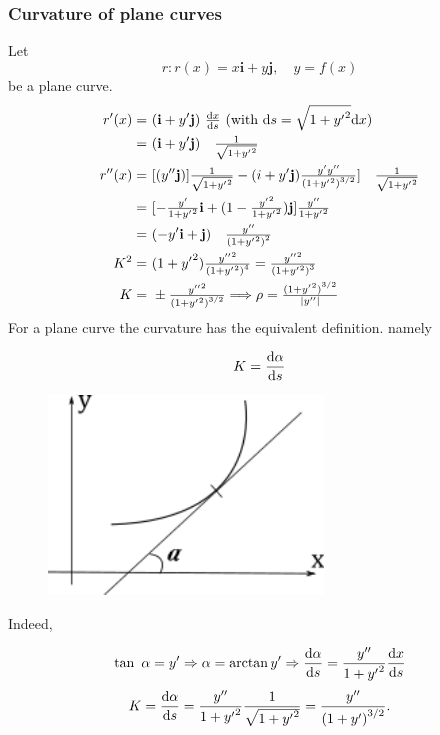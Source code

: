 \documentclass[11pt]{amsbook}
\newcommand{\uvec}[1]{\boldsymbol{\textbf{#1}}}
\begin{document}
    	

\subsubsection{Curvature of plane curves} 
Let 
$$ 
	r : r(x) = x \uvec i + y \uvec j, \quad y=f(x)
$$
be a plane curve.
\begin{align*}
	r'(x) =\ & (\uvec i + y' \uvec j) \ \tfrac{\hDif x}{\hDif s} \ (\text{with  } \hDif s = \sqrt{1 + {y'}^2} \hDif x) \\
	=\ & (\uvec i + y' \uvec j) \quad \tfrac{1}{\sqrt{1 + {y'}^2}} \\
	r''(x) =\ & [(y'' \uvec j)] \tfrac{1}{\sqrt{1 + {y'}^2}} - (i+y' \uvec j) \tfrac{y' y''}{{(1 + {y'}^2)}^{3/2}}] \quad \tfrac{1}{\sqrt{1 + {y'}^2}} \\
	=\ & [ -\tfrac{y'}{1 + {y'}^2} \uvec i + (1 - \tfrac{{y'}^2}{1+{y'}^2}) \uvec j ] \tfrac{y''}{1 + {y'}^2}  \\
	=\ & (-y' \uvec i + \uvec j) \quad \tfrac{y''}{{(1+{y'}^2)}^2} \\
	K^2 =\ & (1+{y'}^2) \tfrac{{y''}^2}{{(1+{y'}^2)}^4} = \tfrac{{y''}^2}{{(1+{y'}^2)}^3} \\
	K =\ & \pm \tfrac{{y''}^2}{{(1+{y'}^2)}^{3/2}} \Longrightarrow \rho = \tfrac{{(1+{y'}^2)}^{3/2}}{{|y''|}}
\end{align*}
For a plane curve the curvature has the equivalent definition. namely


\begin{figure}[htbp]
\begin{minipage}{0.45\linewidth}
	\begin{align*}
		K = \frac{\mathrm{d} \alpha}{\mathrm{d} s} 
	\end{align*}
\end{minipage}
\begin{minipage}{0.45\linewidth}
	\centering
	\includegraphics[width=0.65\textwidth]{images/b2p1-239-fig01}
\end{minipage}
\end{figure}

\par 
Indeed,

\begin{align*}
	\tan\ \alpha = y' \Rightarrow \alpha = \arctan y' \Rightarrow \frac{\mathrm{d} \alpha}{\mathrm{d} s} = \frac{y''}{1+{y'}^2}  \frac{\mathrm{d} x}{\mathrm{d} s} \\
\end{align*}
\begin{align*}
K = \frac{\mathrm{d} \alpha}{\mathrm{d} s} =  \frac{y''}{1+{y'}^2}  \frac{1}{\sqrt{1+{y'}^2}} =  \frac{y''}{{(1+y')}^{3/2}} \text{.}
\end{align*}
\end{document}
